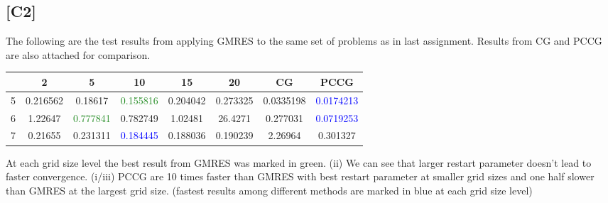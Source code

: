 \documentclass[12pt,a4paper]{article}
\newcommand{\blue}[1]{\textcolor{blue}{#1}}\newcommand{\red}[1]{\textcolor{red}{#1}}\newcommand{\gray}[1]{\textcolor{gray}{#1}}\newcommand{\fgreen}[1]{\textcolor{ForestGreen}{#1}}
\begin{document}
\subsection*{[C2]}
The following are the test results from applying GMRES to the same set of problems as in last assignment. Results from CG and PCCG are also attached for comparison. 
\begin{center}
\begin{tabular}{c|ccccccc}
 & 2 & 5 & 10 & 15 & 20 & CG & PCCG\\
 \hline
5 & 0.216562 & 0.18617 & \fgreen{0.155816} & 0.204042 & 0.273325 & 0.0335198 & \textcolor{blue}{0.0174213}\\
6 & 1.22647 & \fgreen{0.777841} & 0.782749 & 1.02481 & 26.4271 & 0.277031 & \textcolor{blue}{0.0719253}\\
7 & 0.21655 & 0.231311 & \blue{0.184445} & 0.188036 & 0.190239 & 2.26964 & 0.301327
\end{tabular}
\end{center}
At each grid size level the best result from GMRES was marked in green. (ii) We can see that larger restart parameter doesn't lead to faster convergence. (i/iii) PCCG are 10 times faster than GMRES with best restart parameter at smaller grid sizes and one half slower than GMRES at the largest grid size. (fastest results among different methods are marked in blue at each grid size level)
\end{document}
